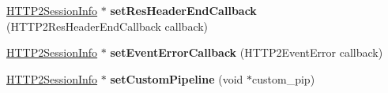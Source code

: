 \begin{DoxyCompactItemize}
\item 
\mbox{\label{classhttp2_1_1HTTP2SessionInfo_adca250a953c25fe06dadc4fdc96d1acb}} 
\hyperlink{classhttp2_1_1HTTP2SessionInfo}{H\+T\+T\+P2\+Session\+Info} $\ast$ {\bfseries set\+Res\+Header\+End\+Callback} (H\+T\+T\+P2\+Res\+Header\+End\+Callback callback)
\item 
\mbox{\label{classhttp2_1_1HTTP2SessionInfo_ae29912bfdd0e93f32eb153b75ea8e2f7}} 
\hyperlink{classhttp2_1_1HTTP2SessionInfo}{H\+T\+T\+P2\+Session\+Info} $\ast$ {\bfseries set\+Event\+Error\+Callback} (H\+T\+T\+P2\+Event\+Error callback)
\item 
\mbox{\label{classhttp2_1_1HTTP2SessionInfo_a96045fba569082e4fb8b41de0f135f54}} 
\hyperlink{classhttp2_1_1HTTP2SessionInfo}{H\+T\+T\+P2\+Session\+Info} $\ast$ {\bfseries set\+Custom\+Pipeline} (void $\ast$custom\+\_\+pip)
\end{DoxyCompactItemize}
